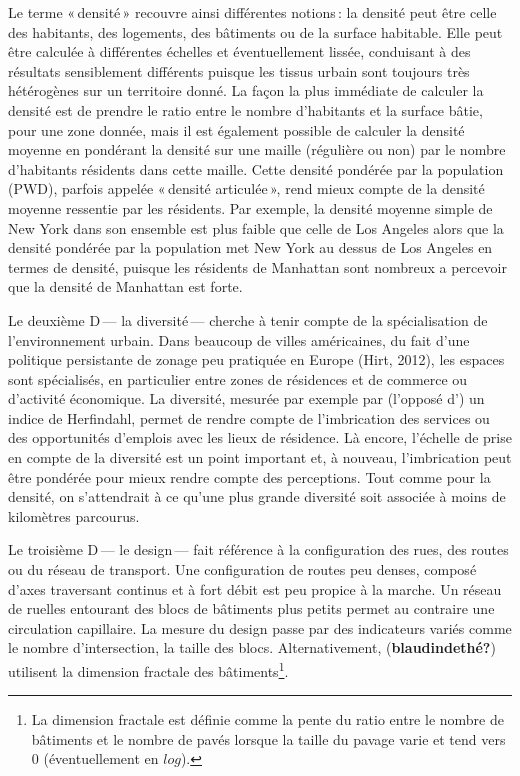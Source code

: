 \documentclass[
  9pt,
  a4paper,
  DIV=11]{scrreprt}
\begin{document}
Le terme «\,densité\,» recouvre ainsi différentes notions\,: la densité
peut être celle des habitants, des logements, des bâtiments ou de la
surface habitable. Elle peut être calculée à différentes échelles et
éventuellement lissée, conduisant à des résultats sensiblement
différents puisque les tissus urbain sont toujours très hétérogènes sur
un territoire donné. La façon la plus immédiate de calculer la densité
est de prendre le ratio entre le nombre d'habitants et la surface bâtie,
pour une zone donnée, mais il est également possible de calculer la
densité moyenne en pondérant la densité sur une maille (régulière ou
non) par le nombre d'habitants résidents dans cette maille. Cette
densité pondérée par la population (PWD), parfois appelée «\,densité
articulée\,», rend mieux compte de la densité moyenne ressentie par les
résidents. Par exemple, la densité moyenne simple de New York dans son
ensemble est plus faible que celle de Los Angeles alors que la densité
pondérée par la population met New York au dessus de Los Angeles en
termes de densité, puisque les résidents de Manhattan sont nombreux a
percevoir que la densité de Manhattan est forte.

Le deuxième D\,--- la diversité\,--- cherche à tenir compte de la
spécialisation de l'environnement urbain. Dans beaucoup de villes
américaines, du fait d'une politique persistante de zonage peu pratiquée
en Europe (Hirt, 2012), les espaces sont spécialisés, en particulier
entre zones de résidences et de commerce ou d'activité économique. La
diversité, mesurée par exemple par (l'opposé d') un indice de
Herfindahl, permet de rendre compte de l'imbrication des services ou des
opportunités d'emplois avec les lieux de résidence. Là encore, l'échelle
de prise en compte de la diversité est un point important et, à nouveau,
l'imbrication peut être pondérée pour mieux rendre compte des
perceptions. Tout comme pour la densité, on s'attendrait à ce qu'une
plus grande diversité soit associée à moins de kilomètres parcourus.

Le troisième D\,--- le design\,--- fait référence à la configuration des
rues, des routes ou du réseau de transport. Une configuration de routes
peu denses, composé d'axes traversant continus et à fort débit est peu
propice à la marche. Un réseau de ruelles entourant des blocs de
bâtiments plus petits permet au contraire une circulation capillaire. La
mesure du design passe par des indicateurs variés comme le nombre
d'intersection, la taille des blocs. Alternativement,
(\textbf{blaudindethé?}) utilisent la dimension fractale des
bâtiments\footnote{La dimension fractale est définie comme la pente du
  ratio entre le nombre de bâtiments et le nombre de pavés lorsque la
  taille du pavage varie et tend vers 0 (éventuellement en \(log\)).}.
\end{document}
